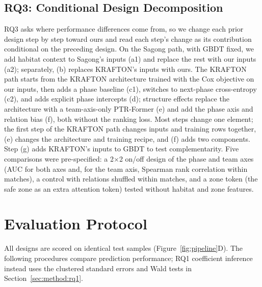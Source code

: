 \documentclass[sigconf,anonymous,nonacm]{acmart}
\begin{document}
\subsection{RQ3: Conditional Design Decomposition}
\label{sec:method:decomposition}
RQ3 asks where performance differences come from, so we change each prior design step by step toward ours and read each step's change as its contribution conditional on the preceding design.
On the Sagong path, with GBDT fixed, we add habitat context to Sagong's inputs (a1) and replace the rest with our inputs (a2); separately, (b) replaces KRAFTON's inputs with ours.
The KRAFTON path starts from the KRAFTON architecture trained with the Cox objective on our inputs, then adds a phase baseline (c1), switches to next-phase cross-entropy (c2), and adds explicit phase intercepts (d); structure effects replace the architecture with a team-axis-only PTR-Former (e) and add the phase axis and relation bias (f), both without the ranking loss.
Most steps change one element; the first step of the KRAFTON path changes inputs and training rows together, (e) changes the architecture and training recipe, and (f) adds two components.
Step (g) adds KRAFTON's inputs to GBDT to test complementarity.
Five comparisons were pre-specified: a 2$\times$2 on/off design of the phase and team axes (AUC for both axes and, for the team axis, Spearman rank correlation within matches), a control with relations shuffled within matches, and a zone token (the safe zone as an extra attention token) tested without habitat and zone features.

\section{Evaluation Protocol}
\label{sec:method:evaluation}
All designs are scored on identical test samples (Figure~\ref{fig:pipeline}D). The following procedures compare prediction performance; RQ1 coefficient inference instead uses the clustered standard errors and Wald tests in Section~\ref{sec:method:rq1}.
\end{document}
